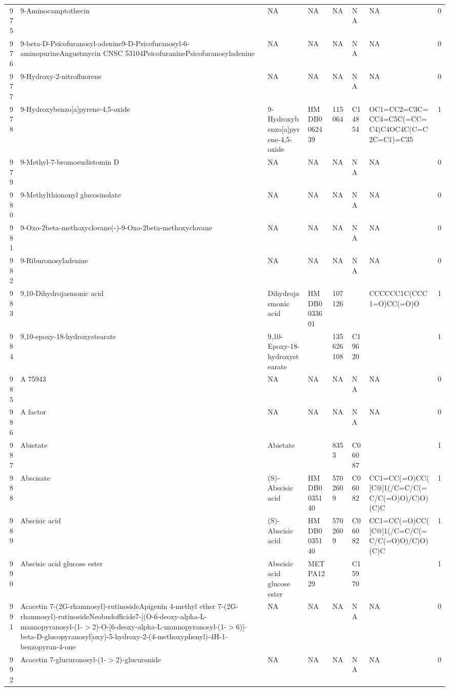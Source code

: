 \documentclass[a4paper]{article}
\begin{document}
\begin{longtable}{rlllllll}
  975 & 9-Aminocamptothecin & NA & NA & NA & NA & NA & 0 \\ 
  976 & 9-beta-D-Psicofuranosyl-adenine9-D-Psicofuranosyl-6-aminopurineAngustmycin CNSC 53104PsicofuraninePsicofuranosyladenine & NA & NA & NA & NA & NA & 0 \\ 
  977 & 9-Hydroxy-2-nitrofluorene & NA & NA & NA & NA & NA & 0 \\ 
  978 & 9-Hydroxybenzo[a]pyrene-4,5-oxide & 9-Hydroxybenzo[a]pyrene-4,5-oxide & HMDB0062439 & 115064 & C14854 & OC1=CC2=C3C=CC4=C5C(=CC=C4)C4OC4C(C=C2C=C1)=C35 & 1 \\ 
  979 & 9-Methyl-7-bromoeudistomin D & NA & NA & NA & NA & NA & 0 \\ 
  980 & 9-Methylthiononyl glucosinolate & NA & NA & NA & NA & NA & 0 \\ 
  981 & 9-Oxo-2beta-methoxyclovane(-)-9-Oxo-2beta-methoxyclovane & NA & NA & NA & NA & NA & 0 \\ 
  982 & 9-Riburonosyladenine & NA & NA & NA & NA & NA & 0 \\ 
  983 & 9,10-Dihydrojasmonic acid & Dihydrojasmonic acid & HMDB0033601 & 107126 &  & CCCCCC1C(CCC1=O)CC(=O)O & 1 \\ 
  984 & 9,10-epoxy-18-hydroxystearate & 9,10-Epoxy-18-hydroxystearate &  & 135626108 & C19620 &  & 1 \\ 
  985 & A 75943 & NA & NA & NA & NA & NA & 0 \\ 
  986 & A factor & NA & NA & NA & NA & NA & 0 \\ 
  987 & Abietate & Abietate &  & 8353 & C06087 &  & 1 \\ 
  988 & Abscisate & (S)-Abscisic acid & HMDB0035140 & 5702609 & C06082 & CC1=CC(=O)CC([C@]1(/C=C/C(=C/C(=O)O)/C)O)(C)C & 1 \\ 
  989 & Abscisic acid & (S)-Abscisic acid & HMDB0035140 & 5702609 & C06082 & CC1=CC(=O)CC([C@]1(/C=C/C(=C/C(=O)O)/C)O)(C)C & 1 \\ 
  990 & Abscisic acid glucose ester & Abscisic acid glucose ester & METPA1229 &  & C15970 &  & 1 \\ 
  991 & Acacetin 7-(2G-rhamnosyl)-rutinosideApigenin 4-methyl ether 7-(2G-rhamnosyl)-rutinosideNeobudofficide7-[(O-6-deoxy-alpha-L-mannopyranosyl-(1-$>$2)-O-[6-deoxy-alpha-L-mannopyranosyl-(1-$>$6)]-beta-D-glucopyranosyl]oxy)-5-hydroxy-2-(4-methoxyphenyl)-4H-1-benzopyran-4-one & NA & NA & NA & NA & NA & 0 \\ 
  992 & Acacetin 7-glucuronosyl-(1-$>$2)-glucuronide & NA & NA & NA & NA & NA & 0 \\ 

\end{longtable}
\end{document}
